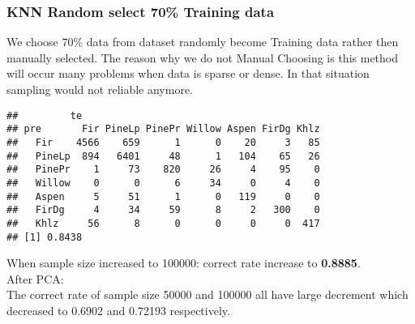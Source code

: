 \documentclass{article}\usepackage[]{graphicx}\usepackage[]{color}
\makeatletter
\newenvironment{kframe}{%
 \def\at@end@of@kframe{}%
 \ifinner\ifhmode%
  \def\at@end@of@kframe{\end{minipage}}%
  \begin{minipage}{\columnwidth}%
 \fi\fi%
 \def\FrameCommand##1{\hskip\@totalleftmargin \hskip-\fboxsep
 \colorbox{shadecolor}{##1}\hskip-\fboxsep
     \hskip-\linewidth \hskip-\@totalleftmargin \hskip\columnwidth}%
 \MakeFramed {\advance\hsize-\width
   \@totalleftmargin\z@ \linewidth\hsize
   \@setminipage}}%
 {\par\unskip\endMakeFramed%
 \at@end@of@kframe}
\newenvironment{knitrout}{}{} %
\makeatother
\begin{document}
	\subsubsection{KNN Random select 70\% Training data }	
\noindent	We choose 70\% data from dataset randomly become Training data rather then manually selected. 
The reason why we do not Manual Choosing is this method will occur many problems when data is sparse or dense. In that situation sampling would not reliable anymore.  \\
\begin{knitrout}
\color{fgcolor}\begin{kframe}
\begin{verbatim}
##         te
## pre       Fir PineLp PinePr Willow Aspen FirDg Khlz
##   Fir    4566    659      1      0    20     3   85
##   PineLp  894   6401     48      1   104    65   26
##   PinePr    1     73    820     26     4    95    0
##   Willow    0      0      6     34     0     4    0
##   Aspen     5     51      1      0   119     0    0
##   FirDg     4     34     59      8     2   300    0
##   Khlz     56      8      0      0     0     0  417
## [1] 0.8438
\end{verbatim}
\end{kframe}
\end{knitrout}
\noindent When sample size increased to 100000: correct rate increase to \textbf{0.8885}.\\
	After PCA:\\
	The correct rate of sample size 50000 and 100000 all have large decrement which decreased to 0.6902 and 0.72193 respectively.\\
\end{document}
